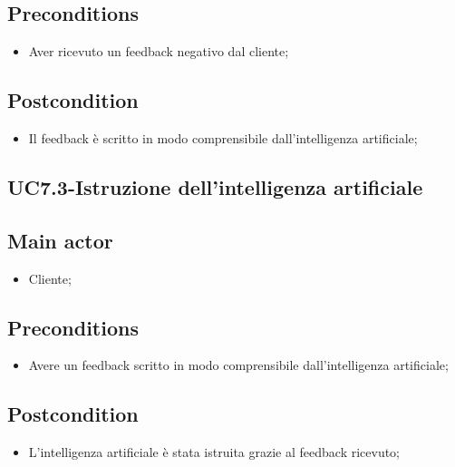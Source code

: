 \documentclass{article}
\begin{document}
     \subsection*{Preconditions} 
        \begin{itemize}
            \item Aver ricevuto un feedback negativo dal cliente;
        \end{itemize}
        \subsection*{Postcondition} 
        \begin{itemize}
            \item Il feedback è scritto in modo comprensibile dall'intelligenza artificiale;
        \end{itemize}
\subsection{UC7.3-Istruzione dell'intelligenza artificiale}
    
     \subsection*{Main actor}
         \begin{itemize}
             \item Cliente;
         \end{itemize}
     \subsection*{Preconditions} 
        \begin{itemize}
            \item Avere un feedback scritto in modo comprensibile dall'intelligenza artificiale;
        \end{itemize}
        \subsection*{Postcondition} 
        \begin{itemize}
            \item L'intelligenza artificiale è stata istruita grazie al feedback ricevuto;
        \end{itemize}
\end{document}
